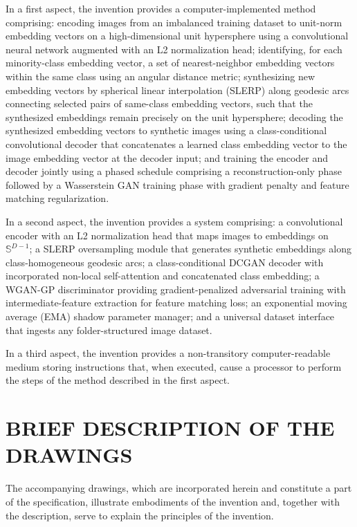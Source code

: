 \documentclass[12pt,letterpaper]{article}
\begin{document}
In a first aspect, the invention provides a computer-implemented method
comprising: encoding images from an imbalanced training dataset to unit-norm
embedding vectors on a high-dimensional unit hypersphere using a convolutional
neural network augmented with an L2 normalization head; identifying, for each
minority-class embedding vector, a set of nearest-neighbor embedding vectors
within the same class using an angular distance metric; synthesizing new
embedding vectors by spherical linear interpolation (SLERP) along geodesic arcs
connecting selected pairs of same-class embedding vectors, such that the
synthesized embeddings remain precisely on the unit hypersphere; decoding the
synthesized embedding vectors to synthetic images using a class-conditional
convolutional decoder that concatenates a learned class embedding vector to the
image embedding vector at the decoder input; and training the encoder and
decoder jointly using a phased schedule comprising a reconstruction-only phase
followed by a Wasserstein GAN training phase with gradient penalty and feature
matching regularization.

In a second aspect, the invention provides a system comprising: a convolutional
encoder with an L2 normalization head that maps images to embeddings on
$\mathbb{S}^{D-1}$; a SLERP oversampling module that generates synthetic
embeddings along class-homogeneous geodesic arcs; a class-conditional DCGAN
decoder with incorporated non-local self-attention and concatenated class
embedding; a WGAN-GP discriminator providing gradient-penalized adversarial
training with intermediate-feature extraction for feature matching loss; an
exponential moving average (EMA) shadow parameter manager; and a universal
dataset interface that ingests any folder-structured image dataset.

In a third aspect, the invention provides a non-transitory computer-readable
medium storing instructions that, when executed, cause a processor to perform
the steps of the method described in the first aspect.

\section*{BRIEF DESCRIPTION OF THE DRAWINGS}

The accompanying drawings, which are incorporated herein and constitute a part
of the specification, illustrate embodiments of the invention and, together
with the description, serve to explain the principles of the invention.
\end{document}
